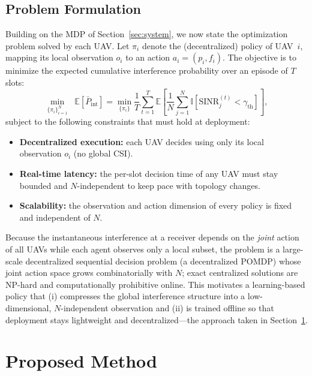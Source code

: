 \documentclass[journal]{IEEEtran}
\begin{document}
\subsection{Problem Formulation}
\label{sec:problem}

Building on the MDP of Section~\ref{sec:system}, we now state the optimization problem solved by each UAV. Let $\pi_i$ denote the (decentralized) policy of UAV~$i$, mapping its local observation $o_i$ to an action $a_i=(p_i,f_i)$. The objective is to minimize the expected cumulative interference probability over an episode of $T$ slots:
\begin{equation}
\min_{\{\pi_i\}_{i=1}^{N}} \;\; \mathbb{E}\!\left[\bar{P}_{\text{int}}\right]
= \min_{\{\pi_i\}} \frac{1}{T}\sum_{t=1}^{T} \mathbb{E}\!\left[\frac{1}{N}\sum_{j=1}^{N}\mathbb{I}\!\left[\text{SINR}_j^{(t)} < \gamma_{\text{th}}\right]\right],
\end{equation}
subject to the following constraints that must hold at deployment:
\begin{itemize}
    \item \textbf{Decentralized execution:} each UAV decides using only its local observation $o_i$ (no global CSI).
    \item \textbf{Real-time latency:} the per-slot decision time of any UAV must stay bounded and $N$-independent to keep pace with topology changes.
    \item \textbf{Scalability:} the observation and action dimension of every policy is fixed and independent of $N$.
\end{itemize}
Because the instantaneous interference at a receiver depends on the \emph{joint} action of all UAVs while each agent observes only a local subset, the problem is a large-scale decentralized sequential decision problem (a decentralized POMDP) whose joint action space grows combinatorially with $N$; exact centralized solutions are NP-hard and computationally prohibitive online. This motivates a learning-based policy that (i) compresses the global interference structure into a low-dimensional, $N$-independent observation and (ii) is trained offline so that deployment stays lightweight and decentralized---the approach taken in Section~\ref{sec:method}.

\section{Proposed Method}
\label{sec:method}
\end{document}

